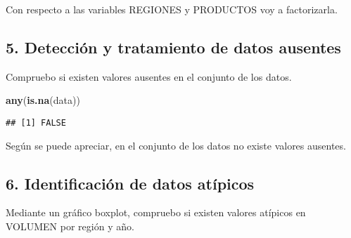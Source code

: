 \documentclass[
]{article}
\newenvironment{Shaded}{\begin{snugshade}}{\end{snugshade}}
\newcommand{\FunctionTok}[1]{\textcolor[rgb]{0.13,0.29,0.53}{\textbf{#1}}}
\newcommand{\NormalTok}[1]{#1}
\newcommand{\OtherTok}[1]{\textcolor[rgb]{0.56,0.35,0.01}{#1}}
\newcommand{\SpecialCharTok}[1]{\textcolor[rgb]{0.81,0.36,0.00}{\textbf{#1}}}
\begin{document}
Con respecto a las variables REGIONES y PRODUCTOS voy a factorizarla.

\begin{Shaded}
\end{Shaded}

\hypertarget{detecciuxf3n-y-tratamiento-de-datos-ausentes}{%
\subsection{5. Detección y tratamiento de datos
ausentes}\label{detecciuxf3n-y-tratamiento-de-datos-ausentes}}

Compruebo si existen valores ausentes en el conjunto de los datos.

\begin{Shaded}
\begin{Highlighting}[]
\FunctionTok{any}\NormalTok{(}\FunctionTok{is.na}\NormalTok{(data))}
\end{Highlighting}
\end{Shaded}

\begin{verbatim}
## [1] FALSE
\end{verbatim}

Según se puede apreciar, en el conjunto de los datos no existe valores
ausentes.

\hypertarget{identificaciuxf3n-de-datos-atuxedpicos}{%
\subsection{6. Identificación de datos
atípicos}\label{identificaciuxf3n-de-datos-atuxedpicos}}

Mediante un gráfico boxplot, compruebo si existen valores atípicos en
VOLUMEN por región y año.
\end{document}
